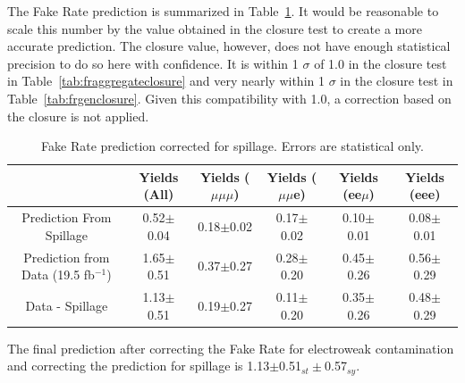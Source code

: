The Fake Rate prediction is summarized in Table~\ref{tab:FRPrediction}. It would be reasonable to scale this number by the value obtained in the closure test to create a more accurate prediction. The closure value, however, does not have enough statistical precision to do so here with confidence. It is within 1 $\sigma$ of 1.0 in the closure test in Table~\ref{tab:fraggregateclosure} and very nearly within 1 $\sigma$ in the closure test in Table~\ref{tab:frgenclosure}. Given this compatibility with 1.0, a correction based on the closure is not applied.\\

\begin{table}
\begin{center}

\begin{tabular}{c|ccccc}\hline
                                              &Yields (All)      &Yields ($\mu\mu\mu$)  &Yields ($\mu\mu$e)  &Yields (ee$\mu$)  &Yields (eee)\\
\hline \hline
Prediction From Spillage                      & 0.52$\pm$0.04   & 0.18$\pm$0.02   & 0.17$\pm$0.02   & 0.10$\pm$0.01   & 0.08$\pm$0.01 \\ 
\hline
Prediction from Data (19.5 fb$^{-1}$)          & 1.65$\pm$0.51   & 0.37$\pm$0.27   & 0.28$\pm$0.20   & 0.45$\pm$0.26   & 0.56$\pm$0.29 \\
\hline
Data - Spillage                               & 1.13$\pm$0.51   & 0.19$\pm$0.27   & 0.11$\pm$0.20   & 0.35$\pm$0.26   & 0.48$\pm$0.29 \\
\end{tabular}
\caption{ \label{tab:FRPrediction} Fake Rate prediction corrected for spillage. Errors are statistical only.}
\end{center}
\end{table}


The final prediction after correcting the Fake Rate for electroweak contamination and correcting the prediction for spillage is 1.13$\pm$0.51$_{st} \pm$0.57$_{sy}$.



\clearpage












		

